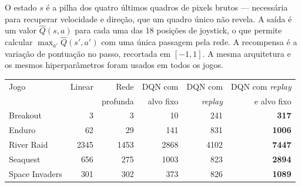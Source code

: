 \documentclass[11pt]{article}
\newcommand{\Qhat}{\widehat{Q}}
\begin{document}
\begin{center}
\end{center}

O estado $s$ é a pilha dos quatro últimos quadros de pixels brutos --- necessária
para recuperar velocidade e direção, que um quadro único não revela. A saída é
um valor $\Qhat(s,a)$ para cada uma das 18 posições de joystick, o que permite
calcular $\max_{a'}\Qhat(s',a')$ com uma única passagem pela rede. A recompensa
é a variação de pontuação no passo, recortada em $[-1,1]$. A mesma arquitetura
e os mesmos hiperparâmetros foram usados em todos os jogos.

\begin{center}\small
\begin{tabular}{lrrrrr}
  \toprule
  Jogo & Linear & Rede & DQN com & DQN com & DQN com \emph{replay} \\
       &        & profunda & alvo fixo & \emph{replay} & e alvo fixo \\
  \midrule
  Breakout       & 3    & 3    & 10   & 241  & \textbf{317} \\
  Enduro         & 62   & 29   & 141  & 831  & \textbf{1006} \\
  River Raid     & 2345 & 1453 & 2868 & 4102 & \textbf{7447} \\
  Seaquest       & 656  & 275  & 1003 & 823  & \textbf{2894} \\
  Space Invaders & 301  & 302  & 373  & 826  & \textbf{1089} \\
  \bottomrule
\end{tabular}
\end{center}
\end{document}
